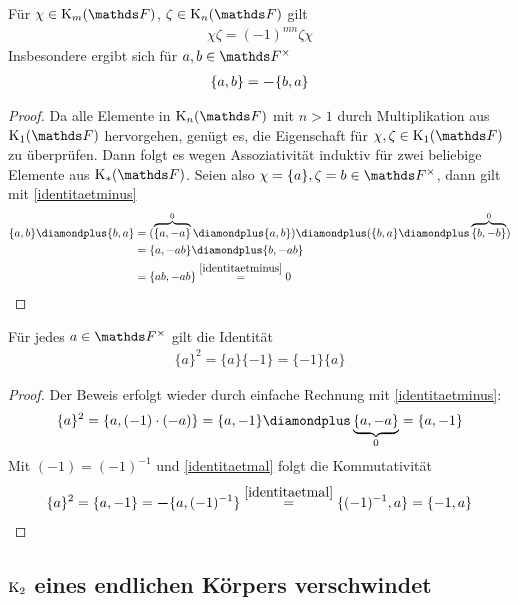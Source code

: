 \documentclass[ngerman,fontsize=11pt, paper=a4, parskip=half, titlepage=true, toc=bib]{scrartcl}
\begin{document}
\begin{Lem}\label{identitaetmal}
  Für $\chi\in\K_m(\F)$, $\zeta\in\K_n(\F)$ gilt
  \begin{gather*}
    \chi\zeta=(-1)^{mn}\zeta\chi
  \end{gather*}
  Insbesondere ergibt sich für $a,b\in \Fx$
  \begin{gather*}
    \{a,b\}= \boldsymbol -\{b,a\}
  \end{gather*}
  \begin{proof}
    Da alle Elemente in $\KnF$ mit $n>1$ durch Multiplikation aus
    $\KoF$ hervorgehen, genügt es, die Eigenschaft für
    $\chi,\zeta\in\KoF$ zu überprüfen. Dann folgt es wegen
    Assoziativität induktiv für zwei beliebige Elemente aus $\KF$.
    Seien also $\chi=\{a\},\zeta=b\in\Fx$, dann gilt mit \ref{identitaetminus}
    \begin{align*}
      \{a,b\}\p \{b,a\} 
      &= (\overbrace{\{a,-a\}}^{0} \p \{a,b\} )
        \p (\{b,a\} \p \overbrace{\{b,-b\}}^{0} ) \\
      &= \{ a,-ab \} \p \{b, -ab\}\\
      &= \{ ab, -ab\} \overset{\ref{identitaetminus}}{=} 0
    \end{align*}
  \end{proof}
\end{Lem}

\begin{Lem}\label{identitaetquadrat}
  Für jedes $a\in \Fx$ gilt die Identität
  \begin{gather*}
    \{a\}^2 = \{a\}\{-1\} = \{-1\}\{a\}
  \end{gather*}
  \begin{proof}
    Der Beweis erfolgt wieder durch einfache Rechnung mit
    \ref{identitaetminus}:
    \begin{gather*}
      \{a\}^2 = \{a,(-1)\cdot (-a)\} 
      = \{a,-1\}\p\underbrace{\{a,-a\}}_{0} = \{a,-1\}
   \end{gather*}
    Mit $(-1)=(-1)^{-1}$ und \ref{identitaetmal} folgt die Kommutativität
    \begin{gather*}
      \{a\}^2 = \{a,-1\}= \boldsymbol -\{a,(-1)^{-1}\} 
      \overset{\ref{identitaetmal}}{=} \{(-1)^{-1},a\} = \{-1,a\}
    \end{gather*}
  \end{proof}
\end{Lem}


\subsection{$\operatorname{K}_2$ eines endlichen Körpers verschwindet}
\end{document}
